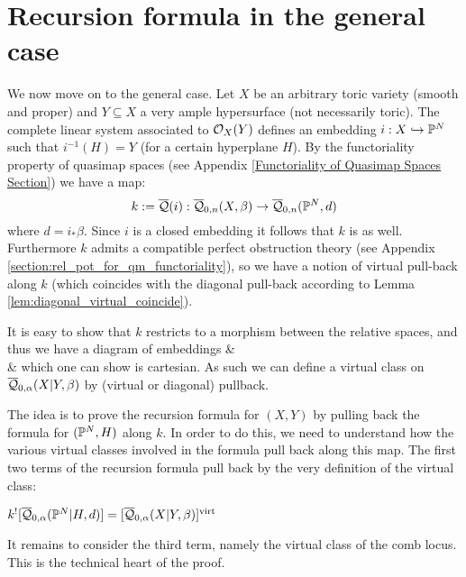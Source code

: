 \section{Recursion formula in the general case}
We now move on to the general case. Let $X$ be an arbitrary toric variety (smooth and proper) and $Y \subseteq X$ a very ample hypersurface (not necessarily toric). The complete linear system associated to $\mathcal{O}_X(Y)$ defines an embedding $i : X \hookrightarrow \mathbb P^N$ such that $i^{-1}(H) = Y$ (for a certain hyperplane $H$). By the functoriality property of quasimap spaces (see Appendix \ref{Functoriality of Quasimap Spaces Section}) we have a map:
\begin{equation*} k := \overline{\mathcal{Q}}(i) : \overline{\mathcal Q}_{0,n}(X,\beta) \rightarrow \overline{\mathcal Q}_{0,n}(\mathbb P^N,d) \end{equation*}
where $d=i_*\beta$. Since $i$ is a closed embedding it follows that $k$ is as well. Furthermore $k$ admits a compatible perfect obstruction theory (see Appendix \ref{section:rel_pot_for_qm_functoriality}), so we have a notion of virtual pull-back along $k$ (which coincides with the diagonal pull-back according to Lemma \ref{lem:diagonal_virtual_coincide}).

It is easy to show that $k$ restricts to a morphism between the relative spaces, and thus we have a diagram of embeddings
\bcd
{} \ar[d, "f", hook] \ar[r, "g", hook]  &  \ar[d, "j", hook] \\
  \ar[r, "k", hook] & 
\ecd
which one can show is cartesian. As such we can define a virtual class on $\overline{\mathcal Q}_{0,\alpha}(X|Y,\beta)$ by (virtual or diagonal) pullback.

The idea is to prove the recursion formula for $(X,Y)$ by pulling back the formula for $(\mathbb P^N,H)$ along $k$. In order to do this, we need to understand how the various virtual classes involved in the formula pull back along this map. The first two terms of the recursion formula pull back by the very definition of the virtual class:
\begin{lemma} \label{Relative spaces pull back} $k^! [\overline{\mathcal Q}_{0,\alpha}(\mathbb P^N|H,d)] = [\overline{\mathcal Q}_{0,\alpha}(X|Y,\beta)]^{\operatorname{virt}}$ \end{lemma}
It remains to consider the third term, namely the virtual class of the comb locus. This is the technical heart of the proof.

